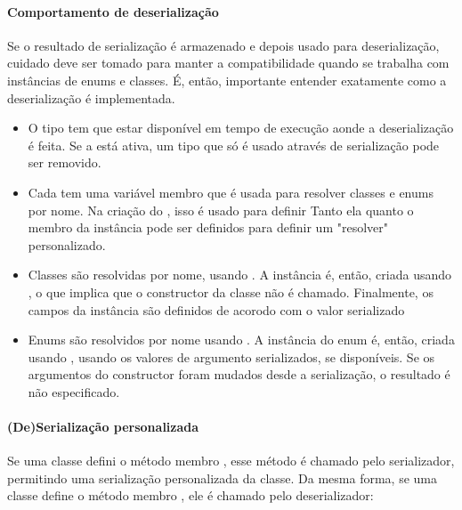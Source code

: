 {\begin{description}
\paragraph{Comportamento de deserialização}

Se o resultado de serialização é armazenado e depois usado para deserialização, cuidado deve ser tomado para manter a compatibilidade quando se trabalha com instâncias de enums e classes. É, então, importante entender exatamente como a deserialização é implementada.

\begin{itemize}
	\item  O tipo tem que estar disponível em tempo de execução aonde a deserialização é feita. Se a  está ativa, um tipo que só é usado através de serialização pode ser removido.
    \item Cada  tem uma variável membro  que é usada para resolver classes e enums por nome. Na criação do , isso é usado para definir  Tanto ela quanto o membro da instância pode ser definidos para  definir um "resolver" personalizado.
    \item Classes são resolvidas por nome, usando . A instância é, então, criada usando , o que implica que o constructor da classe não é chamado. Finalmente, os campos da instância são definidos de acorodo com o valor serializado
    \item Enums são resolvidos por nome usando . A instância do enum é, então, criada usando , usando os valores de argumento serializados, se disponíveis. Se os argumentos do constructor foram mudados desde a serialização, o resultado é não especificado.
\end{itemize}

\paragraph{(De)Serialização personalizada}

Se uma classe defini o método membro , esse método é chamado pelo serializador, permitindo uma serialização personalizada da classe. Da mesma forma, se uma classe define o método membro , ele é chamado pelo deserializador:



\end{description}}
